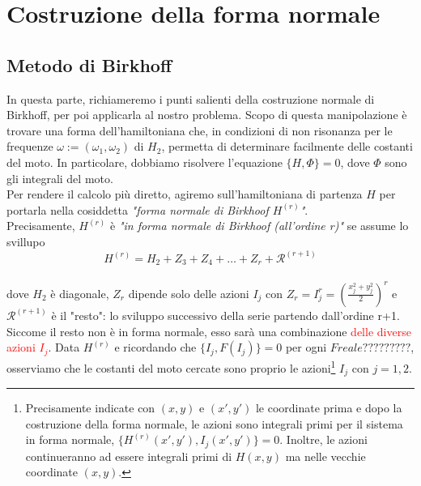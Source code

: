 \documentclass[a4paper,11pt,titlepage]{report}
\theoremstyle{definition}
\theoremstyle{plain}
\begin{document}
\section {Costruzione della forma normale}

\subsection{Metodo di Birkhoff}

In questa parte, richiameremo i punti salienti della costruzione normale di Birkhoff, per poi applicarla al nostro problema. Scopo di questa manipolazione è trovare una forma dell'hamiltoniana che, in  condizioni di non risonanza per le frequenze $\omega:=(\omega_1,\omega_2)$ di $H_2$, permetta di determinare facilmente delle costanti del moto.
In particolare, dobbiamo risolvere l'equazione $\{H,\varPhi\} = 0$, dove $\varPhi$ sono gli integrali del moto. 
\\Per rendere il calcolo più diretto, agiremo sull'hamiltoniana di partenza $H$ per portarla nella cosiddetta \textit{"forma normale di Birkhoof $H^{(r)}$"}. 
\\Precisamente, $H^{(r)}$ è \textit{"in forma normale di Birkhoof (all'ordine r)"} se assume lo svillupo $$H^{(r)} = H_2 + Z_3+ Z_4 + \dots+ Z_r + \mathcal{R}^{(r+1)} $$ \\dove $H_2$ è diagonale, $Z_r$ dipende solo delle azioni $I_j$ con $Z_r = I_j^r= (\frac{x_j^2+y_j^2}{2})^r $ e $ \mathcal{R}^{(r+1)} $ è il "resto": lo sviluppo successivo della serie partendo dall'ordine r+1. Siccome il resto non è in forma normale, esso sarà una combinazione \textcolor{red}{delle diverse azioni $I_j$}.
Data $H^{(r)}$ e ricordando che $\{I_j, F(I_j)\} = 0$ per ogni $F reale?????????$, osserviamo che le costanti del moto cercate sono proprio le azioni\footnote{Precisamente indicate con $(x,y)$ e $(x',y')$ le coordinate prima e dopo la costruzione della forma normale, le azioni sono integrali primi per il sistema in forma normale, $\{H^{(r)}(x',y'),I_j(x',y')\}=0$. Inoltre, le azioni continueranno ad essere integrali primi di $H(x,y)$ ma nelle vecchie coordinate $(x,y)$.} $I_j$ con $j=1,2$.
 
\end{document}
